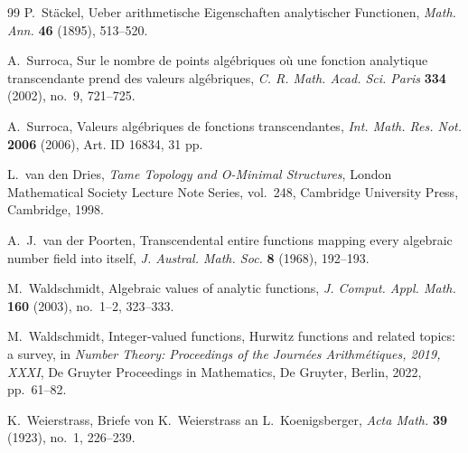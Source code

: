 \documentclass[11pt]{amsart}
\theoremstyle{remark}
\begin{document}
\begin{thebibliography}{99}
P.~St\"ackel,
Ueber arithmetische Eigenschaften analytischer Functionen,
\textit{Math. Ann.} \textbf{46} (1895), 513--520.

A.~Surroca,
Sur le nombre de points alg\'ebriques o\`u une fonction analytique transcendante prend des valeurs alg\'ebriques,
\textit{C. R. Math. Acad. Sci. Paris} \textbf{334} (2002), no.~9, 721--725.

A.~Surroca,
Valeurs alg\'ebriques de fonctions transcendantes,
\textit{Int. Math. Res. Not.} \textbf{2006} (2006), Art. ID 16834, 31 pp.

L.~van den Dries,
\emph{Tame Topology and O-Minimal Structures},
London Mathematical Society Lecture Note Series, vol.~248,
Cambridge University Press, Cambridge, 1998.

A.~J.~van der Poorten,
Transcendental entire functions mapping every algebraic number field into itself,
\textit{J. Austral. Math. Soc.} \textbf{8} (1968), 192--193.

M.~Waldschmidt,
Algebraic values of analytic functions,
\textit{J. Comput. Appl. Math.} \textbf{160} (2003), no.~1--2, 323--333.

M.~Waldschmidt,
Integer-valued functions, Hurwitz functions and related topics: a survey,
in \emph{Number Theory: Proceedings of the Journ\'ees Arithm\'etiques, 2019, XXXI},
De Gruyter Proceedings in Mathematics,
De Gruyter, Berlin, 2022, pp.~61--82.

K.~Weierstrass,
Briefe von K.~Weierstrass an L.~Koenigsberger,
\textit{Acta Math.} \textbf{39} (1923), no.~1, 226--239.

\end{thebibliography}
\end{document}
